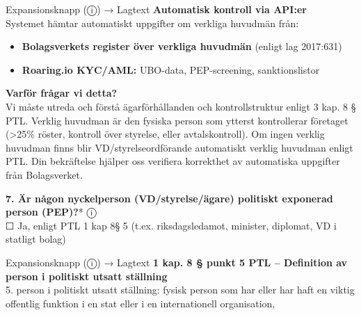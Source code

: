 \documentclass[10pt]{beamer}
\begin{document}
\begin{frame}[label=riskfragor-steg1]
\begin{alertblock}{Expansionsknapp (ⓘ) → Lagtext}
    \tiny \textbf{Automatisk kontroll via API:er}\\
    \tiny Systemet hämtar automatiskt uppgifter om verkliga huvudmän från:
    \begin{itemize}
      \item \textbf{Bolagsverkets register över verkliga huvudmän} (enligt lag 2017:631)
      \item \textbf{Roaring.io KYC/AML:} UBO-data, PEP-screening, sanktionslistor
    \end{itemize}
    \vspace{0.1cm}
    
    \tiny \textbf{Varför frågar vi detta?}\\
    \tiny Vi måste utreda och förstå ägarförhållanden och kontrollstruktur enligt 3 kap. 8 § PTL. Verklig huvudman är den fysiska person som ytterst kontrollerar företaget (>25\% röster, kontroll över styrelse, eller avtalskontroll). Om ingen verklig huvudman finns blir VD/styrelseordförande automatiskt verklig huvudman enligt PTL. Din bekräftelse hjälper oss verifiera korrekthet av automatiska uppgifter från Bolagsverket.
  \end{alertblock}

  \vspace{0.2cm}

  \textbf{7. Är någon nyckelperson (VD/styrelse/ägare) politiskt exponerad person (PEP)?}* \hspace{0.3cm} ⓘ\\
  \tiny
  ☐ Ja, enligt PTL 1 kap 8§ 5 (t.ex. riksdagsledamot, minister, diplomat, VD i statligt bolag)
  \begin{alertblock}{Expansionsknapp (ⓘ) → Lagtext}
    \tiny \textbf{1 kap. 8 § punkt 5 PTL – Definition av person i politiskt utsatt ställning}\\
    \tiny 5. person i politiskt utsatt ställning: fysisk person som har eller har haft en
     viktig offentlig funktion i en stat eller i en internationell organisation,\\[0.1cm]
    

\end{alertblock}
\end{frame}
\end{document}

